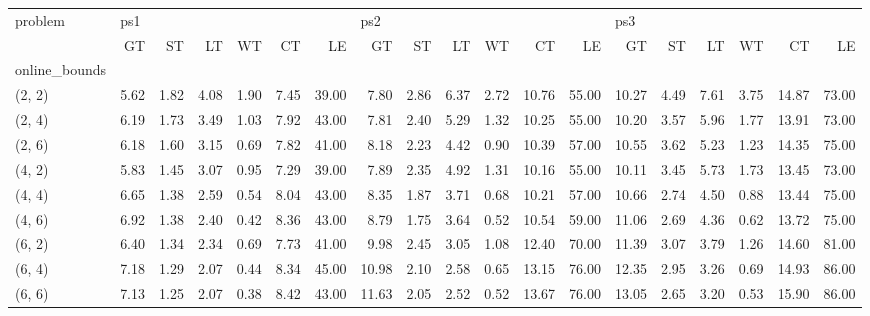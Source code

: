 \begin{tabular}{lrrrrrrrrrrrrrrrrrr}
\toprule
problem & \multicolumn{6}{l}{ps1} & \multicolumn{6}{l}{ps2} & \multicolumn{6}{l}{ps3} \\
{} &   GT &   ST &   LT &   WT &   CT &    LE &    GT &   ST &   LT &   WT &    CT &    LE &    GT &   ST &   LT &   WT &    CT &    LE \\
online\_bounds &      &      &      &      &      &       &       &      &      &      &       &       &       &      &      &      &       &       \\
\midrule
(2, 2)        & 5.62 & 1.82 & 4.08 & 1.90 & 7.45 & 39.00 &  7.80 & 2.86 & 6.37 & 2.72 & 10.76 & 55.00 & 10.27 & 4.49 & 7.61 & 3.75 & 14.87 & 73.00 \\
(2, 4)        & 6.19 & 1.73 & 3.49 & 1.03 & 7.92 & 43.00 &  7.81 & 2.40 & 5.29 & 1.32 & 10.25 & 55.00 & 10.20 & 3.57 & 5.96 & 1.77 & 13.91 & 73.00 \\
(2, 6)        & 6.18 & 1.60 & 3.15 & 0.69 & 7.82 & 41.00 &  8.18 & 2.23 & 4.42 & 0.90 & 10.39 & 57.00 & 10.55 & 3.62 & 5.23 & 1.23 & 14.35 & 75.00 \\
(4, 2)        & 5.83 & 1.45 & 3.07 & 0.95 & 7.29 & 39.00 &  7.89 & 2.35 & 4.92 & 1.31 & 10.16 & 55.00 & 10.11 & 3.45 & 5.73 & 1.73 & 13.45 & 73.00 \\
(4, 4)        & 6.65 & 1.38 & 2.59 & 0.54 & 8.04 & 43.00 &  8.35 & 1.87 & 3.71 & 0.68 & 10.21 & 57.00 & 10.66 & 2.74 & 4.50 & 0.88 & 13.44 & 75.00 \\
(4, 6)        & 6.92 & 1.38 & 2.40 & 0.42 & 8.36 & 43.00 &  8.79 & 1.75 & 3.64 & 0.52 & 10.54 & 59.00 & 11.06 & 2.69 & 4.36 & 0.62 & 13.72 & 75.00 \\
(6, 2)        & 6.40 & 1.34 & 2.34 & 0.69 & 7.73 & 41.00 &  9.98 & 2.45 & 3.05 & 1.08 & 12.40 & 70.00 & 11.39 & 3.07 & 3.79 & 1.26 & 14.60 & 81.00 \\
(6, 4)        & 7.18 & 1.29 & 2.07 & 0.44 & 8.34 & 45.00 & 10.98 & 2.10 & 2.58 & 0.65 & 13.15 & 76.00 & 12.35 & 2.95 & 3.26 & 0.69 & 14.93 & 86.00 \\
(6, 6)        & 7.13 & 1.25 & 2.07 & 0.38 & 8.42 & 43.00 & 11.63 & 2.05 & 2.52 & 0.52 & 13.67 & 76.00 & 13.05 & 2.65 & 3.20 & 0.53 & 15.90 & 86.00 \\
\bottomrule
\end{tabular}
